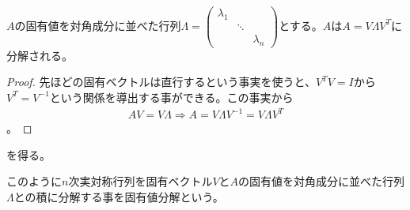 \begin{theorem*}
  $A$の固有値を対角成分に並べた行列$\Lambda = \displaystyle{\left(\begin{array}{ccc} \lambda_1 & & \\ & \ddots & \\ & & \lambda_n \end{array}\right)}$とする。$A$は$A = V \Lambda V^T$に分解される。
\end{theorem*}
\begin{proof}
  先ほどの固有ベクトルは直行するという事実を使うと、$V^T V = I$から$V^T = V^{-1}$という関係を導出する事ができる。この事実から
  \begin{align*}
    A V = V \Lambda \Rightarrow A = V \Lambda V^{-1} = V \Lambda V^T
  \end{align*}
  。
\end{proof}
を得る。

このように$n$次実対称行列を固有ベクトル$V$と$A$の固有値を対角成分に並べた行列$\Lambda$との積に分解する事を固有値分解という。
